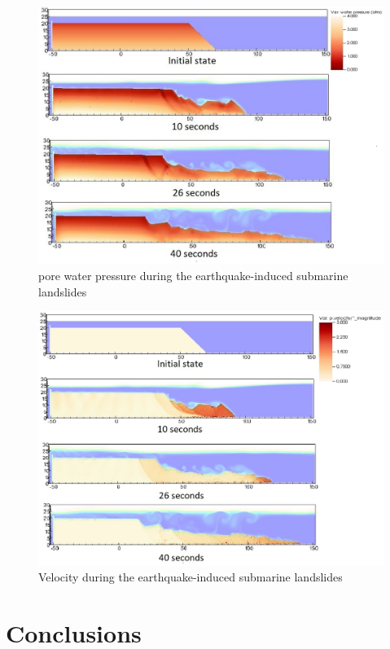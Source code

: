 \documentclass[preprint,12pt]{elsarticle}
\begin{document}
%
%
\begin{figure}[h]
\center
\includegraphics[scale=0.5]{PWP.jpeg}
\caption{pore water pressure during the earthquake-induced submarine landslides}
\label{fig:PWP}
\end{figure}
%
%

%
%
\begin{figure}[h]
\center
\includegraphics[scale=0.5]{landslide_vel.jpg}
\caption{Velocity during the earthquake-induced submarine landslides}
\label{fig:vel}
\end{figure}
%
%


\section{\textsf{Conclusions}}
\end{document}
